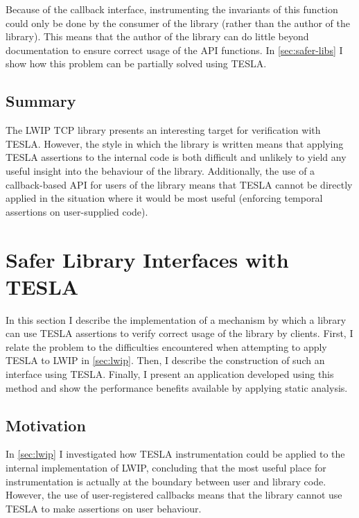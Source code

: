 Because of the callback interface, instrumenting the invariants of this
function could only be done by the consumer of the library (rather than
the author of the library). This means that the author of the library
can do little beyond documentation to ensure correct usage of the API
functions. In \autoref{sec:safer-libs} I show how this problem can be partially
solved using TESLA.

\subsection{Summary}

The LWIP TCP library presents an interesting target for verification with TESLA.
However, the style in which the library is written means that applying TESLA
assertions to the internal code is both difficult and unlikely to yield any
useful insight into the behaviour of the library. Additionally, the use of a
callback-based API for users of the library means that TESLA cannot be directly
applied in the situation where it would be most useful (enforcing temporal
assertions on user-supplied code).

\section{Safer Library Interfaces with TESLA} \label{sec:safer-libs}

In this section I describe the implementation of a mechanism by which a
library can use TESLA assertions to verify correct usage of the library
by clients. First, I relate the problem to the difficulties encountered
when attempting to apply TESLA to LWIP in \autoref{sec:lwip}. Then, I
describe the construction of such an interface using TESLA. Finally, I
present an application developed using this method and show the
performance benefits available by applying static analysis.

\subsection{Motivation}

In \autoref{sec:lwip} I investigated how TESLA instrumentation could be applied
to the internal implementation of LWIP, concluding that the most useful place
for instrumentation is actually at the boundary between user and library code.
However, the use of user-registered callbacks means that the library cannot use
TESLA to make assertions on user behaviour.


